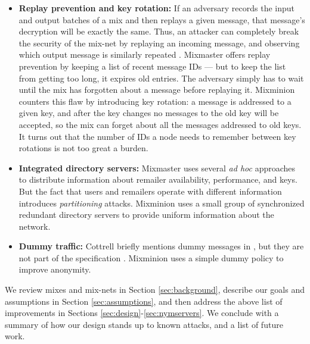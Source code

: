 \documentclass[11pt]{IEEEtran}
\begin{document}
\begin{itemize}
\item \textbf{Replay prevention and key rotation:} 
If an adversary records the input and output batches of a mix and then
replays a given message, that message's decryption will be exactly the
same. Thus, an attacker can completely break the security of the mix-net by
replaying an incoming message, and observing which output message is 
similarly repeated
\cite{chaum-mix}. Mixmaster offers replay prevention by
keeping a list of recent message IDs --- but to keep the list from
getting too long, it expires old entries. The adversary simply has to
wait until the mix has forgotten about a
message before replaying it. Mixminion counters this flaw by introducing
key rotation: a message is addressed to a given key, and after the key
changes no messages to the old key will be accepted, so the mix can forget
about all the messages addressed to old keys. It turns out that the
number of IDs a node needs to remember between key rotations is not
too great a burden.

\item \textbf{Integrated directory servers:} Mixmaster uses several \emph{ad hoc}
approaches to distribute information about remailer availability, performance, and
keys. But the fact that users and remailers operate with
different information introduces \emph{partitioning} attacks.  Mixminion
uses a small group of synchronized redundant directory servers
to provide uniform information about the network.

\item \textbf{Dummy traffic:} Cottrell briefly mentions dummy messages in
\cite{mixmaster-attacks}, but they are not part of the specification
\cite{mixmaster-spec}. Mixminion uses a simple dummy policy to
improve anonymity.

\end{itemize}


We review mixes and mix-nets in Section \ref{sec:background},
describe our goals and assumptions in Section \ref{sec:assumptions},
and then address the above list of improvements in Sections
\ref{sec:design}-\ref{sec:nymservers}. We conclude with a summary of
how our design stands up to known attacks, and a list of future work.
\end{document}

